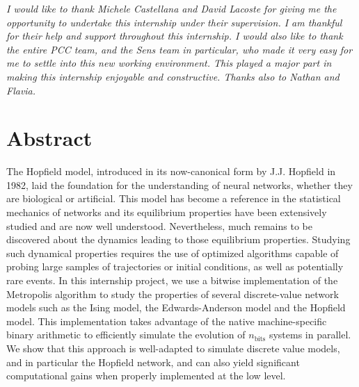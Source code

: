 \documentclass[a4paper,11pt]{article}
\begin{document}
\begin{titlepage}
\newpage
\vspace*{\fill}
\hspace*{\fill}
\begin{minipage}{0.8\textwidth}
\begin{flushright}
\begin{justify}
\textit{
I would like to thank Michele Castellana and David Lacoste for giving me the opportunity to undertake
this internship under their supervision. I am thankful for their help and support
throughout this internship. I would also like to thank the entire PCC team, and the Sens team in particular, who made it very easy for me to settle into this new working environment. This played a major part in making this internship enjoyable and constructive. Thanks also to Nathan and Flavia.}

\end{justify}
\end{flushright}
\end{minipage}
\vspace*{\fill}

\newpage
\section*{Abstract}
The Hopfield model, introduced in its now-canonical form by J.J. Hopfield in 1982, laid the foundation for the understanding of neural networks, whether they are biological or artificial. This model has become a reference in the statistical mechanics of networks and its equilibrium properties have been extensively studied and are now well understood. Nevertheless, much remains to be discovered about the dynamics leading to those equilibrium properties. Studying such dynamical properties requires the use of optimized algorithms capable of probing large samples of trajectories or initial conditions, as well as potentially rare events. In this internship project, we use a bitwise implementation of the Metropolis algorithm to study the properties of several discrete-value network models such as the Ising model, the Edwards-Anderson model and the Hopfield model. This implementation takes advantage of the native machine-specific binary arithmetic to efficiently simulate the evolution of $n_\text{bits}$ systems in parallel. We show that this approach is well-adapted to simulate discrete value models, and in particular the Hopfield network, and can also yield significant computational gains when properly implemented at the low level.

\newpage
\pagestyle{empty}

\end{titlepage}
\Large{\tableofcontents}
\addtocounter{page}{3}
\pagestyle{fancy}
\normalsize

\newpage







\pagestyle{fancy}
\setlength{\bibsep}{2pt}


\end{document}
